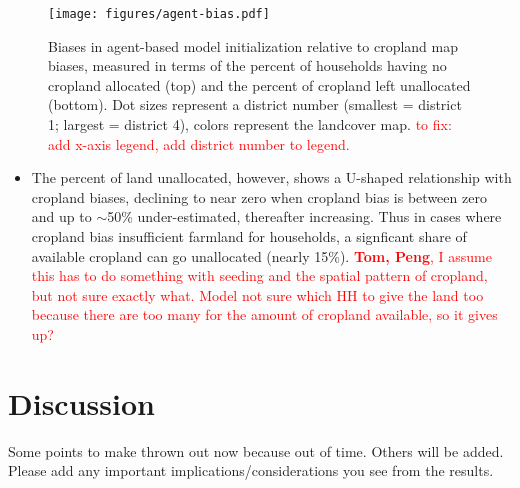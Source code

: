 \documentclass{pnastwo}
\begin{document}
\begin{article}
\vspace{-0.5 cm}
\begin{figure}[ht]
\centerline{\texttt{[image: figures/agent-bias.pdf]}}
\caption{Biases in agent-based model initialization relative to cropland map biases, measured in terms of the percent of households having no cropland allocated (top) and the percent of cropland left unallocated (bottom). Dot sizes represent a district number (smallest = district 1; largest = district 4), colors represent the landcover map.  \textcolor{red}{to fix: add x-axis legend, add district number to legend.}}
\label{afoto}
\end{figure}

\begin{itemize}
  \item The percent of land unallocated, however, shows a U-shaped relationship with cropland biases, declining to near zero when cropland bias is between zero and up to $\sim$50\% under-estimated, thereafter increasing. Thus in cases where cropland bias insufficient farmland for households, a signficant share of available cropland can go unallocated (nearly 15\%).  \textcolor{red}{\textbf{Tom, Peng}, I assume this has to do something with seeding and the spatial pattern of cropland, but not sure exactly what. Model not sure which HH to give the land too because there are too many for the amount of cropland available, so it gives up? }
\end{itemize}


\section{Discussion}

Some points to make thrown out now because out of time. Others will be added. Please add any important implications/considerations you see from the results.  


\end{article}
\end{document}
